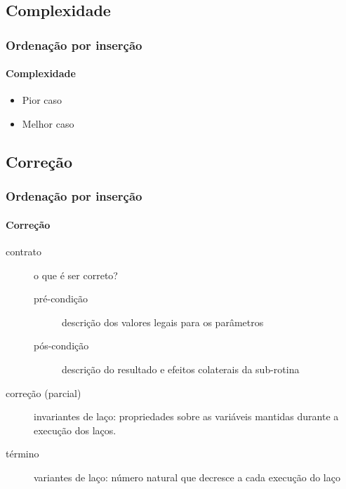 \documentclass{beamer}
\begin{document}
\subsection{Complexidade}

\begin{frame}

  \frametitle{Ordenação por inserção}
  \framesubtitle{Complexidade}

  \begin{itemize}
    \item Pior caso
    \item Melhor caso
  \end{itemize}
\end{frame}

\subsection{Correção}

\begin{frame}

  \frametitle{Ordenação por inserção}
  \framesubtitle{Correção}

\begin{description}
\item[contrato] o que é ser correto?
  \begin{description}
    \item[pré-condição] descrição dos valores legais para os parâmetros
    \item[pós-condição] descrição do resultado e efeitos colaterais da
      sub-rotina
  \end{description}
\item[correção (parcial)] invariantes de laço: propriedades sobre as
  variáveis mantidas durante a execução dos laços.
\item[término] variantes de laço: número natural que decresce a cada
  execução do laço
\end{description}

\end{frame}
\end{document}
